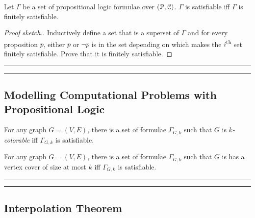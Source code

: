 \documentclass[11pt,usenames, dvipsnames]{article}
\begin{document}
\begin{theorem}
  Let $\Gamma$ be a set of propositional logic formulae over $(\props, \conn)$. $\Gamma$ is satisfiable iff $\Gamma$ is finitely satisfiable.
\end{theorem}

\begin{proof}[Proof sketch.]
  Inductively define a set that is a superset of $\Gamma$ and for every proposition $p$, either $p$ or $\neg p$ is in the set depending on which makes the $i$\textsuperscript{th} set finitely satisfiable. Prove that it is finitely satisfiable.
\end{proof}

\vspace{5truemm}
\hrule
\hrule

\subsection{\large \centering Modelling Computational Problems with Propositional Logic}
\noindent

\begin{claim}
  For any graph $G = (V, E)$, there is a set of formulae $\Gamma_{G, k}$ such that $G$ is \emph{$k$-colorable} iff $\Gamma_{G, k}$ is satisfiable.
\end{claim}

\begin{claim}
  For any graph $G = (V, E)$, there is a set of formulae $\Gamma_{G, k}$ such that $G$ is has a vertex cover of size at most $k$ iff $\Gamma_{G, k}$ is satisfiable.
\end{claim}

\vspace{5truemm}
\hrule
\hrule

\subsection{\large \centering Interpolation Theorem}
\noindent
\end{document}
